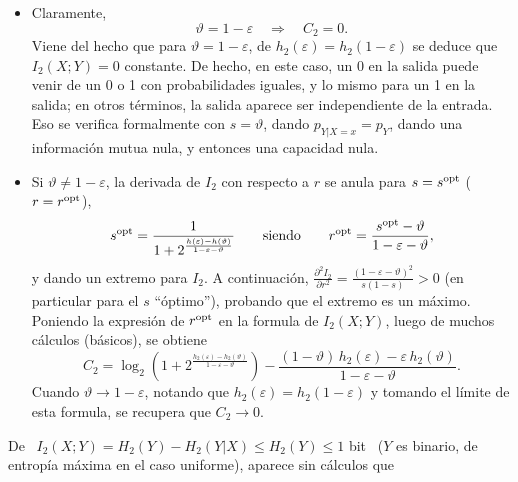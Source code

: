 \begin{itemize}
\item Claramente,
  \[
  \vartheta = 1-\varepsilon \quad \Rightarrow \quad C_2 = 0.
  \]
  Viene del hecho  que para $\vartheta = 1-\varepsilon$,  de $h_2(\varepsilon) =
  h_2(1-\varepsilon)$ se deduce que $I_2(X;Y)  = 0$ constante. De hecho, en este
  caso, un 0 en la salida puede venir  de un 0 o 1 con probabilidades iguales, y
  lo mismo para  un 1 en la  salida; en otros t\'erminos, la  salida aparece ser
  independiente de la entrada.  Eso se verifica formalmente con $s = \vartheta$,
  dando $p_{Y|X=x}  = p_Y$, dando una  informaci\'on mutua nula,  y entonces una
  capacidad nula.
%
\item Si $\vartheta  \ne 1-\varepsilon$, la derivada de $I_2$  con respecto a $r$
  se anula para $s = s^{\mathrm{opt}}$ ($r = r^{\mathrm{opt}}$),
  \[
  s^{\mathrm{opt}} = \frac{1}{1 +  2^{\frac{h(\varepsilon) - h(\vartheta)}{1 - \varepsilon
        -  \vartheta}}}  \qquad \mbox{siendo}  \qquad  r^{\mathrm{opt}}  = \frac{s^{\mathrm{opt}}  -
    \vartheta}{1 - \varepsilon - \vartheta},
  \]
  y  dando   un  extremo   para  $I_2$.   A   continuaci\'on,  $\frac{\partial^2
    I_2}{\partial  r^2} = \frac{(1-\varepsilon-\vartheta)^2}{s  (1-s)} >  0$ (en
  particular para el $s$ ``\'optimo''),  probando que el extremo es un m\'aximo.
  Poniendo  la expresi\'on de  $r^{\mathrm{opt}}$ en  la formula  de $I_2(X;Y)$,  luego de
  muchos c\'alculos (b\'asicos), se obtiene
  \[
  C_2  =  \log_2\left(  1  +  2^{\frac{h_2(\varepsilon)  -  h_2(\vartheta)}{1  -
        \varepsilon   -  \vartheta}}   \right)  -   \frac{(1  -   \vartheta)  \,
    h_2(\varepsilon)  -   \varepsilon  \,  h_2(\vartheta)}{1   -  \varepsilon  -
    \vartheta}.
  \]
  Cuando  $\vartheta   \to  1-\varepsilon$,  notando   que  $h_2(\varepsilon)  =
  h_2(1-\varepsilon)$ y  tomando el  l\'imite de esta  formula, se  recupera que
  $C_2 \to 0$.
\end{itemize}
%
\noindent De  \ $I_2(X;Y) = H_2(Y)  - H_2(Y|X) \le H_2(Y)  \le 1$ bit  \ ($Y$ es
binario, de entrop\'ia m\'axima en el caso uniforme), aparece sin c\'alculos que

